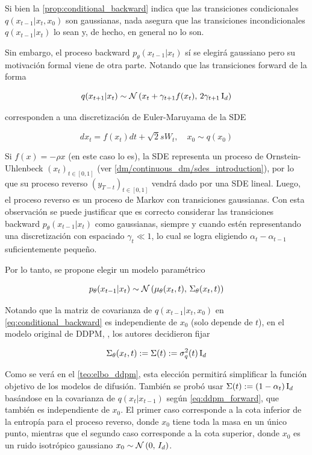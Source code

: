 Si bien la \autoref{prop:conditional_backward} indica que las transiciones condicionales $q(x_{t-1}|x_t,x_0)$ son gaussianas, nada asegura que las transiciones incondicionales $q(x_{t-1}|x_t)$ lo sean y, de hecho, en general no lo son.

Sin embargo, el proceso backward $p_\theta(x_{t-1}|x_t)$ sí se elegirá gaussiano pero su motivación formal viene de otra parte. Notando que las transiciones forward de la forma

\begin{equation}
    q(x_{t+1}|x_{t})\sim\mathcal{N}\left(x_t+\gamma_{t+1} f(x_t),\,2\gamma_{t+1}\operatorname{I}_{d}\right)
\end{equation}

corresponden a una discretización de Euler-Maruyama de la SDE

\begin{equation}
    dx_t = f(x_t)dt + \sqrt{2}sW_t,\quad x_0\sim q(x_0)
\end{equation}

Si $f(x)=-\rho x$ (en este caso lo es), la SDE representa un proceso de Ornstein-Uhlenbeck $(x_t)_{t\in[0,1]}$ (ver \autoref{dm/continuous_dm/sdes_introduction}), por lo que su proceso reverso $(y_{T-t})_{t\in[0,1]}$ vendrá dado por una SDE lineal. Luego, el proceso reverso es un proceso de Markov con transiciones gaussianas. Con esta observación se puede justificar que es correcto considerar las transiciones backward $p_\theta(x_{t-1}|x_t)$ como gaussianas, siempre y cuando estén representando una discretización con espaciado $\gamma_t\ll 1$, lo cual se logra eligiendo $\alpha_{t}-\alpha_{t-1}$ suficientemente pequeño.

Por lo tanto, se propone elegir un modelo paramétrico

\begin{equation}
    \label{eq:backward_transition}
    p_\theta(x_{t-1}|x_t)\sim\mathcal{N}\left(\mu_\theta(x_t,t),\,\Sigma_\theta(x_t,t)\right)
\end{equation}

Notando que la matriz de covarianza de $q(x_{t-1}|x_t,x_0)$ en \eqref{eq:conditional_backward} es independiente de $x_0$ (solo depende de $t$), en el modelo original de DDPM, \cite{ho2020denoising}, los autores decidieron fijar

\begin{equation}
    \label{eq:backward_covariance}
    \Sigma_\theta(x_t,t):=\Sigma(t):=\sigma_q^2(t)\operatorname{I}_{d}
\end{equation}

Como se verá en el \autoref{teo:elbo_ddpm}, esta elección permitirá simplificar la función objetivo de los modelos de difusión. También se probó usar $\Sigma(t):=(1-\alpha_{t})\operatorname{I}_{d}$ basándose en la covarianza de $q(x_{t}|x_{t-1})$ según \eqref{eq:ddpm_forward}, que también es independiente de $x_0$. El primer caso corresponde a la cota inferior de la entropía para el proceso reverso, donde $x_0$ tiene toda la masa en un único punto, mientras que el segundo caso corresponde a la cota superior, donde $x_0$ es un ruido isotrópico gaussiano $x_0\sim\mathcal{N}\left(0,\,I_d\right)$.

